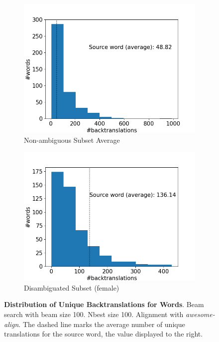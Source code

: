 \begin{figure}[!htb]
\begin{subfigure}{0.49\textwidth}
     \end{subfigure}
     \begin{subfigure}{0.49\textwidth}
         \centering
         \includegraphics[width=\textwidth]{figures/alignment/align_100/word_backtranslations_average.png}
         \caption{Non-ambiguous Subset Average}
     \end{subfigure}
     \hfill
     \begin{subfigure}{0.49\textwidth}
         \centering
         \includegraphics[width=\textwidth]{figures/alignment/align_100/word_backtranslations_female.png}
         \caption{Disambiguated Subset (female)}
     \end{subfigure}
        \caption[Distribution of Unique Backtranslations for Words: Beam search with beam size 100]{\textbf{Distribution of Unique Backtranslations for Words}. Beam search with beam size 100. Nbest size 100. Alignment with \textit{awesome-align}. The dashed line marks the average number of unique translations for the source word, the value displayed to the right.}
        \label{fig:alignment_graphs_backtranslation_100}

\end{figure}

